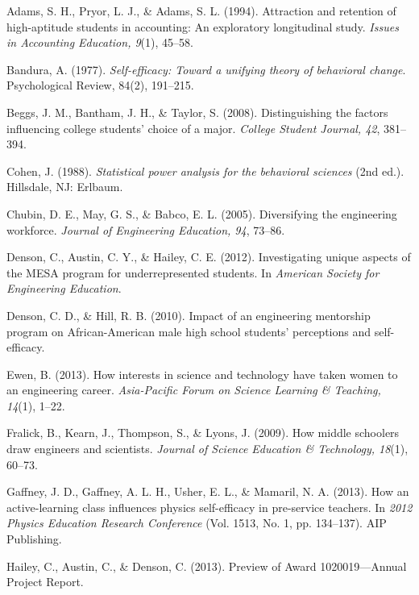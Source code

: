\documentclass[11pt]{article}
\begin{document}

\begin{thebibliography}{99}

Adams, S. H., Pryor, L. J., \& Adams, S. L. (1994). Attraction and retention of high-aptitude students in accounting: An exploratory longitudinal study. \textit{Issues in Accounting Education, 9}(1), 45–58.

Bandura, A. (1977). \textit{Self-efficacy: Toward a unifying theory of behavioral change}. Psychological Review, 84(2), 191–215.

Beggs, J. M., Bantham, J. H., \& Taylor, S. (2008). Distinguishing the factors influencing college students’ choice of a major. \textit{College Student Journal, 42}, 381–394.

Cohen, J. (1988). \textit{Statistical power analysis for the behavioral sciences} (2nd ed.). Hillsdale, NJ: Erlbaum.

Chubin, D. E., May, G. S., \& Babco, E. L. (2005). Diversifying the engineering workforce. \textit{Journal of Engineering Education, 94}, 73–86.

Denson, C., Austin, C. Y., \& Hailey, C. E. (2012). Investigating unique aspects of the MESA program for underrepresented students. In \textit{American Society for Engineering Education}.

Denson, C. D., \& Hill, R. B. (2010). Impact of an engineering mentorship program on African-American male high school students’ perceptions and self-efficacy.

Ewen, B. (2013). How interests in science and technology have taken women to an engineering career. \textit{Asia-Pacific Forum on Science Learning \& Teaching, 14}(1), 1–22.

Fralick, B., Kearn, J., Thompson, S., \& Lyons, J. (2009). How middle schoolers draw engineers and scientists. \textit{Journal of Science Education \& Technology, 18}(1), 60–73.

Gaffney, J. D., Gaffney, A. L. H., Usher, E. L., \& Mamaril, N. A. (2013). How an active-learning class influences physics self-efficacy in pre-service teachers. In \textit{2012 Physics Education Research Conference} (Vol. 1513, No. 1, pp. 134–137). AIP Publishing.

Hailey, C., Austin, C., \& Denson, C. (2013). Preview of Award 1020019—Annual Project Report.


\end{thebibliography}
\end{document}
